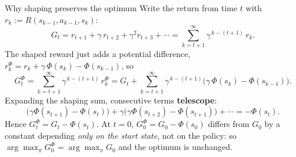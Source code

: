 \begin{frame}{Why shaping preserves the optimum}
Write the return from time $t$ with $r_k := R(s_{k-1},a_{k-1},s_k)$:
\[
  G_t = r_{t+1} + \gamma\, r_{t+2} + \gamma^2 r_{t+3} + \cdots
      = \sum_{k=t+1}^{\infty} \gamma^{\,k-(t+1)}\, r_k.
\]
\pause
The shaped reward just adds a potential difference, $r_k^\Phi = r_k + \gamma\,\Phi(s_k) - \Phi(s_{k-1})$, so
\[
  G_t^\Phi = \sum_{k=t+1}^{\infty} \gamma^{\,k-(t+1)}\, r_k^\Phi
           = G_t + \sum_{k=t+1}^{\infty} \gamma^{\,k-(t+1)}\big(\gamma\,\Phi(s_k) - \Phi(s_{k-1})\big).
\]
\pause
Expanding the shaping sum, consecutive terms \textbf{telescope}:
\[
  \big(\gamma\Phi(s_{t+1}) - \Phi(s_t)\big)
  + \gamma\big(\gamma\Phi(s_{t+2}) - \Phi(s_{t+1})\big)
  + \cdots = -\Phi(s_t).
\]
\pause
Hence $G_t^\Phi = G_t - \Phi(s_t)$. At $t=0$, $G_0^\Phi = G_0 - \Phi(s_0)$ differs from $G_0$ by a constant depending \emph{only on the start state}, not on the policy: so $\arg\max_\pi G_0^\Phi = \arg\max_\pi G_0$ and the optimum is unchanged.
\end{frame}



